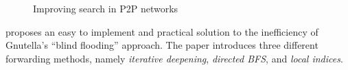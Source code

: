 \begin{figure}[ht]
\centering
{}\qquad\qquad
{}\qquad\qquad
{}
\caption{Improving search in P2P networks}
\label{figure:dbfs}
\end{figure}

\cite{yang_improvep2psearch_2002} proposes an easy to implement and practical
solution to the inefficiency of Gnutella's ``blind flooding'' approach. The
paper introduces three different forwarding methods, namely \emph{iterative
deepening}, \emph{directed BFS}, and \emph{local indices}.

